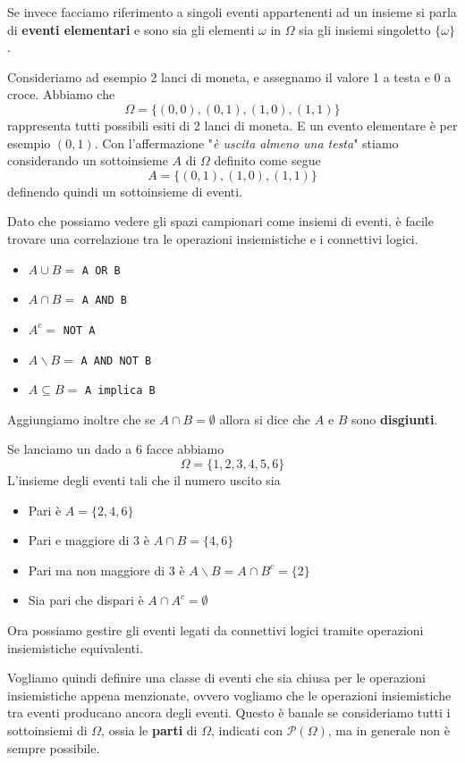 Se invece facciamo riferimento a singoli eventi appartenenti ad un insieme si parla di
\textbf{eventi elementari} e sono sia gli elementi $\omega$ in $\Omega$ sia gli insiemi singoletto
$\{\omega\}$.

\begin{example}
	Consideriamo ad esempio 2 lanci di moneta, e assegnamo il valore 1 a testa e 0 a croce. Abbiamo
	che
	\[ \Omega = \{ (0,0), (0,1), (1,0), (1,1) \} \]
	rappresenta tutti possibili esiti di 2 lanci di moneta. E un evento elementare è per esempio
	$(0,1)$. Con l'affermazione "\emph{è uscita almeno una testa}" stiamo considerando un
	sottoinsieme $A$ di $\Omega$ definito come segue
	\[ A = \{ (0,1), (1,0), (1,1) \} \]
	definendo quindi un sottoinsieme di eventi.
\end{example}

Dato che possiamo vedere gli spazi campionari come insiemi di eventi, è facile trovare una
correlazione tra le operazioni insiemistiche e i connettivi logici.
\begin{itemize}
	\item $A \cup B =$ \verb|A OR B|
	\item $A \cap B =$ \verb|A AND B|
	\item $A^c = $ \verb|NOT A|
	\item $A \backslash B =$ \verb|A AND NOT B|
	\item $A \subseteq B =$ \verb|A implica B|
\end{itemize}
Aggiungiamo inoltre che se $A \cap B = \emptyset$ allora si dice che $A$ e $B$ sono
\textbf{disgiunti}.

\begin{example}
	Se lanciamo un dado a 6 facce abbiamo
	\[ \Omega = \{ 1, 2, 3, 4, 5, 6 \} \]
	L'insieme degli eventi tali che il numero uscito sia
	\begin{itemize}
		\item Pari è $A = \{ 2, 4, 6 \}$
		\item Pari e maggiore di 3 è $A \cap B = \{ 4, 6 \}$
		\item Pari ma non maggiore di 3 è $A \backslash B = A \cap B^c = \{2\}$
		\item Sia pari che dispari è $A \cap A^c = \emptyset$
	\end{itemize}
\end{example}

Ora possiamo gestire gli eventi legati da connettivi logici tramite operazioni insiemistiche
equivalenti.

Vogliamo quindi definire una classe di eventi che sia chiusa per le operazioni insiemistiche
appena menzionate, ovvero vogliamo che le operazioni insiemistiche tra eventi producano ancora
degli eventi. Questo è banale se consideriamo tutti i sottoinsiemi di $\Omega$, ossia le
\textbf{parti} di $\Omega$, indicati con $\mathcal{P}(\Omega)$, ma in generale non è sempre
possibile.

